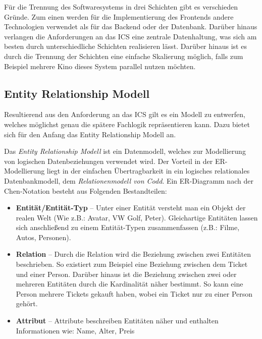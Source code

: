 		Für die Trennung des Softwaresystems in drei Schichten gibt es verschieden Gründe. Zum einen werden für die Implementierung des Frontends andere Technologien verwendet als für das Backend oder der Datenbank. Darüber hinaus verlangen die Anforderungen an das \ac{ICS} eine zentrale Datenhaltung, was sich am besten durch unterschiedliche Schichten realisieren lässt. Darüber hinaus ist es durch die Trennung der Schichten eine einfache Skalierung möglich, falls zum Beispiel mehrere Kino dieses System parallel nutzen möchten.
		\subsection{Entity Relationship Modell}\label{chapter:er-diagramm}
		Resultierend aus den Anforderung an das \ac{ICS} gilt es ein Modell zu entwerfen, welches möglichst genau die spätere Fachlogik repräsentieren kann. Dazu bietet sich für den Anfang das \glqq Entity Relationship Modell\grqq{} an.
		
		Das \textit{\glqq Entity Relationship Modell\grqq{}} ist ein Datenmodell, welches zur Modellierung von logischen Datenbeziehungen verwendet wird. Der Vorteil in der ER-Modellierung liegt in der einfachen Übertragbarkeit in ein logisches relationales Datenbankmodell, dem \textit{Relationenmodell von Codd}. Ein ER-Diagramm nach der Chen-Notation besteht aus Folgenden Bestandteilen:\autocite[Vgl.][]{Stobitzer.0130201914:40Uhr}
		\begin{itemize}
			\item \textbf{Entität/Entität-Typ} -- Unter einer Entität versteht man ein Objekt der realen Welt (Wie z.B.: Avatar, VW Golf, Peter). Gleichartige Entitäten lassen sich anschließend zu einem Entität-Typen zusammenfassen (z.B.: Filme, Autos, Personen).\autocite[Vgl.][]{Stobitzer.0130201914:40Uhr} 
			\item \textbf{Relation} -- Durch die Relation wird die Beziehung zwischen zwei Entitäten beschrieben. So existiert zum Beispiel eine Beziehung zwischen dem Ticket und einer Person. Darüber hinaus ist die Beziehung zwischen zwei oder mehreren Entitäten durch die Kardinalität näher bestimmt. So kann eine Person mehrere Tickets gekauft haben, wobei ein Ticket nur zu einer Person gehört.\autocite[Vgl.][]{Stobitzer.0130201914:40Uhr}
			\item \textbf{Attribut} -- Attribute beschreiben Entitäten näher und enthalten Informationen wie: Name, Alter, Preis
		\end{itemize}
		
